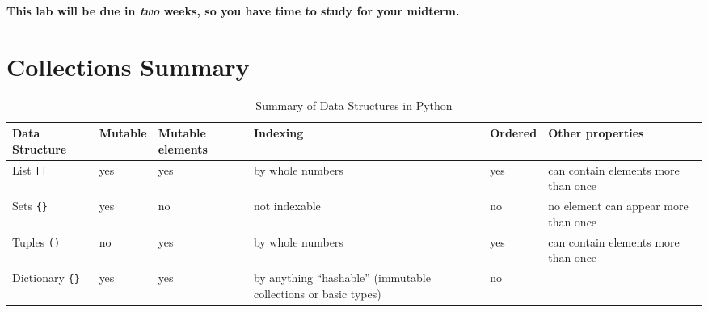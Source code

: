 \documentclass[11pt]{cselabheader}
\begin{document}
\textbf{This lab will be due in \emph{two} weeks, so you have time to study for your
midterm.}

%
%
%
%

\pagebreak
\section{Collections Summary}

\begin{table}[!ht]
  \centering
  \begin{tabular}{p{1.6cm}lp{1.6cm}p{3.5cm}lp{4.5cm}}
    \toprule
    Data Structure & Mutable & Mutable elements & Indexing & Ordered
    & Other
    properties\\
    \midrule
    List \lstinline![]! & yes & yes & by whole numbers & yes & can contain elements more than once\\
    Sets \lstinline!{}! & yes & no & not indexable & no & no element can appear more than once\\
    Tuples \lstinline!()! & no & yes & by whole numbers & yes & can contain elements more than
    once\\
    Dictionary \lstinline!{}! & yes & yes & by anything ``hashable'' (immutable collections or
    basic types) & no & \\
    \bottomrule
  \end{tabular}
  \caption{Summary of Data Structures in Python}
  \label{tab:sum}
\end{table}
\end{document}
